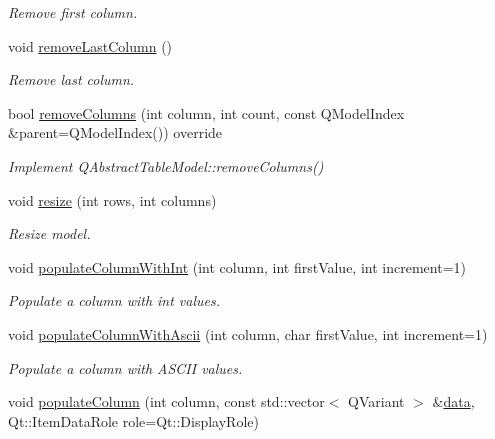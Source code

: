 \begin{DoxyCompactItemize}
\begin{DoxyCompactList}\small\item\em Remove first column. \end{DoxyCompactList}\item 
void \hyperlink{class_mdt_1_1_item_model_1_1_variant_table_model_a02bcc8e91fbac9afa1ec79af9a870c59}{remove\+Last\+Column} ()\hypertarget{class_mdt_1_1_item_model_1_1_variant_table_model_a02bcc8e91fbac9afa1ec79af9a870c59}{}\label{class_mdt_1_1_item_model_1_1_variant_table_model_a02bcc8e91fbac9afa1ec79af9a870c59}

\begin{DoxyCompactList}\small\item\em Remove last column. \end{DoxyCompactList}\item 
bool \hyperlink{class_mdt_1_1_item_model_1_1_variant_table_model_a6091c284af32cef7eaba917f0233ffab}{remove\+Columns} (int column, int count, const Q\+Model\+Index \&parent=Q\+Model\+Index()) override
\begin{DoxyCompactList}\small\item\em Implement Q\+Abstract\+Table\+Model\+::remove\+Columns() \end{DoxyCompactList}\item 
void \hyperlink{class_mdt_1_1_item_model_1_1_variant_table_model_a76fa49b2a855d67d3a77f8c86ef996e7}{resize} (int rows, int columns)
\begin{DoxyCompactList}\small\item\em Resize model. \end{DoxyCompactList}\item 
void \hyperlink{class_mdt_1_1_item_model_1_1_variant_table_model_acac5b4e0db09d93611d5eb0232d1a1d9}{populate\+Column\+With\+Int} (int column, int first\+Value, int increment=1)
\begin{DoxyCompactList}\small\item\em Populate a column with int values. \end{DoxyCompactList}\item 
void \hyperlink{class_mdt_1_1_item_model_1_1_variant_table_model_a7dbaf44c75eb3c8074a3e3d70be25753}{populate\+Column\+With\+Ascii} (int column, char first\+Value, int increment=1)
\begin{DoxyCompactList}\small\item\em Populate a column with A\+S\+C\+II values. \end{DoxyCompactList}\item 
void \hyperlink{class_mdt_1_1_item_model_1_1_variant_table_model_a7d5a58a9383e56d61c5066085e36c9e6}{populate\+Column} (int column, const std\+::vector$<$ Q\+Variant $>$ \&\hyperlink{class_mdt_1_1_item_model_1_1_variant_table_model_a88bb1b4c736812bfd14e9008923c39a4}{data}, Qt\+::\+Item\+Data\+Role role=Qt\+::\+Display\+Role)

\end{DoxyCompactItemize}
